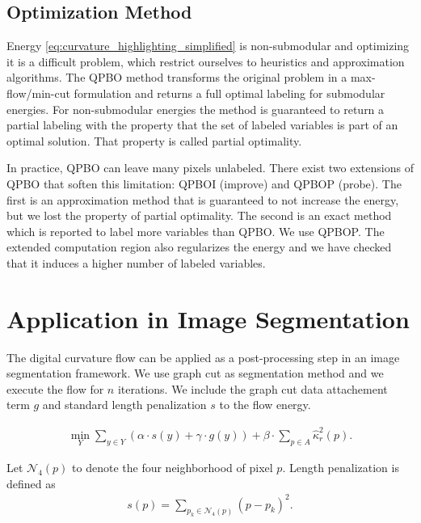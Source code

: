 \documentclass[runningheads]{llncs}
\begin{document}
\subsection{Optimization Method}\label{sec:optimization_method}

	Energy \eqref{eq:curvature_highlighting_simplified} is non-submodular and optimizing it is a difficult problem, which restrict ourselves to heuristics and approximation algorithms. The QPBO method \cite{kolmogorov07} transforms the original problem in a max-flow/min-cut formulation and returns a full optimal labeling for submodular energies. For non-submodular energies the method is guaranteed to return a partial labeling with the property that the set of labeled variables is part of an optimal solution. That property is called partial optimality. 

	In practice, QPBO can leave many pixels unlabeled. There exist two extensions of QPBO that soften this limitation: QPBOI (improve) and QPBOP (probe). The first is an approximation method that is guaranteed to not increase the energy, but we lost the property of partial optimality. The second is an exact method which is reported to label more variables than QPBO. We use QPBOP. The extended computation region also regularizes the energy and we have checked that it induces a higher number of labeled variables.
	
\section{Application in Image Segmentation}

The digital curvature flow can be applied as a post-processing step in an image segmentation framework. We use graph cut \cite{boykov01} as segmentation method and we execute the flow for $n$ iterations. We include the graph cut data attachement term $g$ and standard length penalization $s$ to the flow energy.



\begin{align}			
	\min_{Y} \sum_{y \in Y}{\left( \alpha \cdot s(y) + \gamma \cdot g(y) \right)} + \beta \cdot \sum_{p \in A}{\hat{\kappa}_{r}^2(p)}.
	\label{eq:boundary-correction-energy}
\end{align}
	
	Let $\mathcal{N}_4(p)$ to denote the four neighborhood of pixel $p$. Length penalization is defined as
	\begin{align*}
		s(p)=\sum_{p_k \in \mathcal{N}_4(p)}{ (p-p_k) }^2.
	\end{align*}
\end{document}
